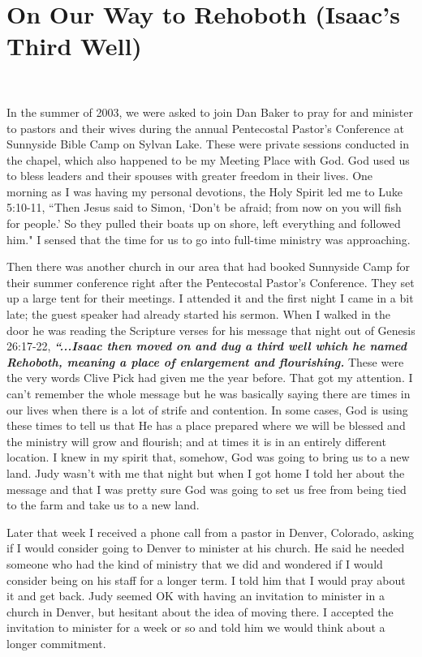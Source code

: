 \documentclass[oneside]{book}
\begin{document}
\section{On Our Way to Rehoboth (Isaac's Third Well)}
\

In the summer of 2003, we were asked to join Dan Baker to pray for and minister to pastors and their wives during the annual Pentecostal Pastor's Conference at Sunnyside Bible Camp on Sylvan Lake. These were private sessions conducted in the chapel, which also happened to be my Meeting Place with God. God used us to bless leaders and their spouses with greater freedom in their lives. One morning as I was having my personal devotions, the Holy Spirit led me to Luke 5:10-11, ``Then Jesus said to Simon, `Don't be afraid; from now on you will fish for people.' So they pulled their boats up on shore, left everything and followed him." I sensed that the time for us to go into full-time ministry was approaching. 

Then there was another church in our area that had booked Sunnyside Camp for their summer conference right after the Pentecostal Pastor's Conference. They set up a large tent for their meetings. I attended it and the first night I came in a bit late; the guest speaker had already started his sermon. When I walked in the door he was reading the Scripture verses for his message that night out of Genesis 26:17-22, \textit{\textbf{``...Isaac then moved on and dug a third well which he named Rehoboth, meaning a place of enlargement and flourishing.}} These were the very words Clive Pick had given me the year before. That got my attention. I can't remember the whole message but he was basically saying there are times in our lives when there is a lot of strife and contention. In some cases, God is using these times to tell us that He has a place prepared where we will be blessed and the ministry will grow and flourish; and at times it is in an entirely different location. I knew in my spirit that, somehow, God was going to bring us to a new land. Judy wasn't with me that night but when I got home I told her about the message and that I was pretty sure God was going to set us free from being tied to the farm and take us to a new land. 

Later that week I received a phone call from a pastor in Denver, Colorado, asking if I would consider going to Denver to minister at his church. He said he needed someone who had the kind of ministry that we did and wondered if I would consider being on his staff for a longer term. I told him that I would  pray about it and get back. Judy seemed OK with having an invitation to minister in a church in Denver, but hesitant about the idea of moving there. I accepted the invitation to minister for a week or so and told him we would think about a longer commitment.
\end{document}
